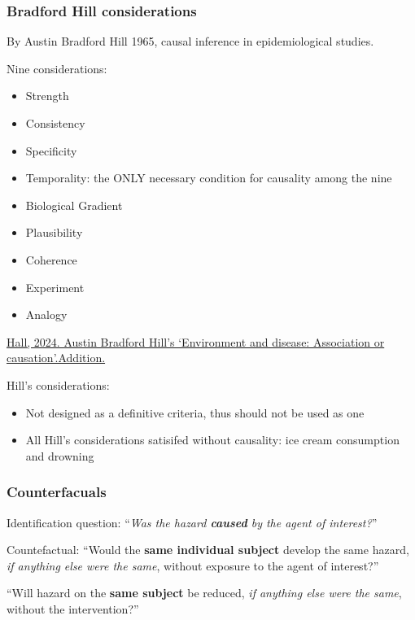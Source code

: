\documentclass[
  letterpaper,
  DIV=11,
  numbers=noendperiod]{scrartcl}
\begin{document}
\subsubsection{Bradford Hill
considerations}\label{bradford-hill-considerations}

By Austin Bradford Hill 1965, causal inference in epidemiological
studies.

Nine considerations:

\begin{itemize}
\item
  Strength
\item
  Consistency
\item
  Specificity
\item
  Temporality: the ONLY necessary condition for causality among the nine
\item
  Biological Gradient
\item
  Plausibility
\item
  Coherence
\item
  Experiment
\item
  Analogy
\end{itemize}

\href{https://research.ebsco.com/c/hrh7jr/viewer/html/4j23s2octz}{Hall,
2024. Austin Bradford Hill's `Environment and disease: Association or
causation'.Addition.}

Hill's considerations:

\begin{itemize}
\item
  Not designed as a definitive criteria, thus should not be used as one
\item
  All Hill's considerations satisifed without causality: ice cream
  consumption and drowning
\end{itemize}

\subsubsection{Counterfacuals}\label{counterfacuals}

Identification question: ``\emph{Was the hazard \textbf{caused} by the
agent of interest?}''

Countefactual: ``Would the \textbf{same individual subject} develop the
same hazard, \emph{if anything else were the same}, without exposure to
the agent of interest?''

``Will hazard on the \textbf{same subject} be reduced, \emph{if anything
else were the same}, without the intervention?''
\end{document}

